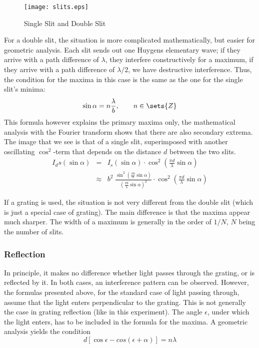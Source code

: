 \documentclass[a4paper,10pt]{article}
\begin{document}
\begin{figure}[htbp]
    \centering
    \texttt{[image: slits.eps]}
    \caption{Single Slit and Double Slit}
    \label{slits}
\end{figure}

For a double slit, the situation is more complicated mathematically, but easier for geometric analysis. Each slit sends out one Huygens elementary wave; if they arrive with a path difference of $\lambda$, they interfere constructively for a maximum, if they arrive with a path difference of $\lambda/2$, we have destructive interference. Thus, the condition for the maxima in this case is the same as the one for the single slit's minima:
\begin{equation}
\sin \alpha = n \frac{\lambda}{b}, \qquad n \in \sets{Z}
\end{equation}
This formula however explains the primary maxima only, the mathematical analysis with the Fourier transform shows that there are also secondary extrema. The image that we see is that of a single slit, superimposed with another oscillating $\cos^2$-term that depends on the distance $d$ between the two slits.
\begin{eqnarray}
I_ds(\sin \alpha) &=& I_s(\sin \alpha) \cdot \cos^2 \left( \frac{\pi d}{\lambda} \sin\alpha \right) \nonumber\\
&\approx& b^2 \; \frac{\sin^2\left( \frac{\pi b}{\lambda} \sin \alpha \right)}{\left( \frac{\pi b}{\lambda} \sin \alpha \right)^2} \cdot \cos^2 \left( \frac{\pi d}{\lambda} \sin\alpha \right)
\end{eqnarray}

If a grating is used, the situation is not very different from the double slit (which is just a special case of grating). The main difference is that the maxima appear much sharper. The width of a maximum is generally in the order of $1/N$, $N$ being the number of slits.

\subsubsection*{Reflection}
In principle, it makes no difference whether light passes through the grating, or is reflected by it. In both cases, an interference pattern can be observed. However, the formulas presented above, for the standard case of light passing through, assume that the light enters perpendicular to the grating. This is not generally the case in grating reflection (like in this experiment). The angle $\epsilon$, under which the light enters, has to be included in the formula for the maxima. A geometric analysis yields the condition
\begin{equation}
d\left[ \cos \epsilon - cos(\epsilon + \alpha) \right] = n \lambda
\end{equation}
\end{document}
